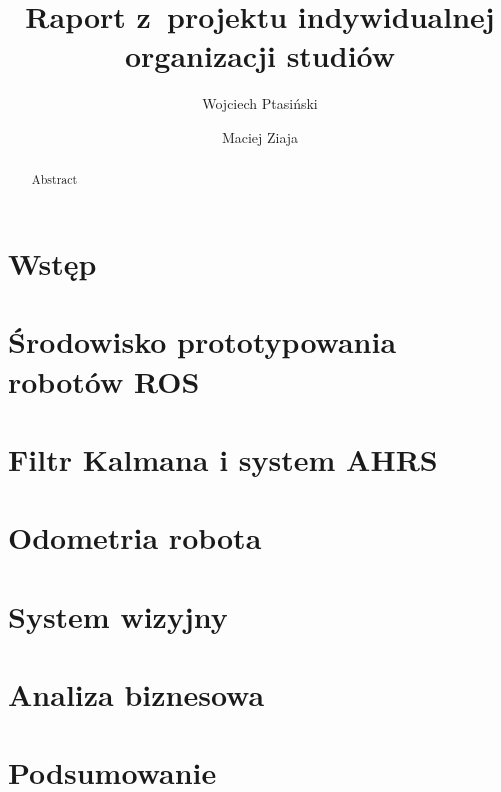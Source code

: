 \documentclass[a4paper]{report}
\author{Wojciech Ptasiński \and Maciej Ziaja}
\title{Raport z~projektu indywidualnej organizacji studiów}
\begin{document}
\maketitle

\begin{abstract}
Abstract
\end{abstract}

\tableofcontents

\section{Wstęp}


\section{Środowisko prototypowania robotów ROS}


\section{Filtr Kalmana i system AHRS}


\section{Odometria robota}


\section{System wizyjny}


\section{Analiza biznesowa}


\section{Podsumowanie}


\listoffigures
\listoftables
\listoflistings

\nocite{*}


\end{document}
